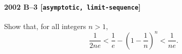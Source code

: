 \paragraph{2002 B--3 \textnormal{[\texttt{asymptotic, limit-sequence}]}}
Show that, for all integers $n > 1$,
\[
\frac{1}{2ne} < \frac{1}{e} - \left( 1 - \frac{1}{n} \right)^n
< \frac{1}{ne}.
\]

